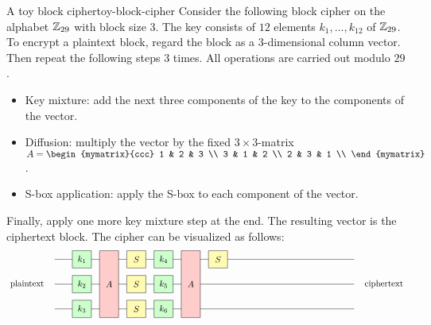 \begin{definition}{A toy block cipher}{toy-block-cipher}
  Consider the following block cipher on the alphabet $\mathbb{Z}_{29}$ with
  block size $3$. The key consists of $12$ elements $k_1,\ldots,k_{12}$
  of $\mathbb{Z}_{29}$. To encrypt a plaintext block, regard the block as a
  $3$-dimensional column vector. Then repeat the following steps $3$
  times. All operations are carried out modulo $29$.
  \begin{itemize}
  \item Key mixture: add the next three components of the key to the
    components of the vector.
  \item Diffusion: multiply the vector by the fixed $3\times 3$-matrix
    $A = \begin{mymatrix}{ccc}
      1 & 2 & 3 \\
      3 & 1 & 2 \\
      2 & 3 & 1 \\
    \end{mymatrix}$.
  \item S-box application: apply the S-box to each component of the
    vector.
  \end{itemize}
  Finally, apply one more key mixture step at the end. The resulting
  vector is the ciphertext block. The cipher can be visualized as
  follows:
  \begin{equation*}
    \begin{tikzpicture}[xscale=1.1,
      a/.style={fill=red!20},
      s/.style={fill=yellow!30},
      k/.style={fill=green!20}]
      \draw (0,2) -- (11,2);
      \draw (0,1) node[left=2ex]{plaintext} -- (11,1) node[right=2ex]{ciphertext};
      \draw (0,0) -- (11,0);
      \draw[k] (1,2) +(-0.35,-0.35) rectangle node{$k_{1}$} +(0.35,0.35);
      \draw[k] (1,1) +(-0.35,-0.35) rectangle node{$k_{2}$} +(0.35,0.35);
      \draw[k] (1,0) +(-0.35,-0.35) rectangle node{$k_{3}$} +(0.35,0.35);
      \draw[a] (2,0) +(-0.35,-0.35) rectangle node{$A$} +(0.35,2.35);
      \draw[s] (3,2) +(-0.35,-0.35) rectangle node{$S$} +(0.35,0.35);
      \draw[s] (3,1) +(-0.35,-0.35) rectangle node{$S$} +(0.35,0.35);
      \draw[s] (3,0) +(-0.35,-0.35) rectangle node{$S$} +(0.35,0.35);
      \draw[k] (4,2) +(-0.35,-0.35) rectangle node{$k_{4}$} +(0.35,0.35);
      \draw[k] (4,1) +(-0.35,-0.35) rectangle node{$k_{5}$} +(0.35,0.35);
      \draw[k] (4,0) +(-0.35,-0.35) rectangle node{$k_{6}$} +(0.35,0.35);
      \draw[a] (5,0) +(-0.35,-0.35) rectangle node{$A$} +(0.35,2.35);
      \draw[s] (6,2) +(-0.35,-0.35) rectangle node{$S$} +(0.35,0.35);

\end{tikzpicture}
\end{equation*}
\end{definition}
